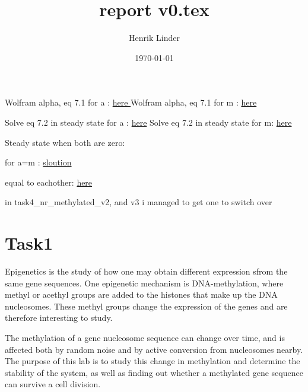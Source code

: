 \documentclass{article}
\title{report v0.tex }
\author{Henrik Linder}
\date{\today}
\begin{document}
\maketitle

Wolfram alpha, eq 7.1 for a  : \href{https://www.wolframalpha.com/input?i=solve+0+\%3D+alpha*\%28a*\%281-a-m\%29+-+a*m\%29+\%2B+\%281+-+alpha\%29*\%28\%281-a-m\%29\%2F2+-+a\%29+for+a+}{here }
Wolfram alpha, eq 7.1 for m  : \href{https://www.wolframalpha.com/input?i=solve+0+%3D+alpha*%28a*%281-a-m%29+-+a*m%29+%2B+%281+-+alpha%29*%28%281-a-m%29%2F2+-+a%29+for+m}{here }

Solve eq 7.2 in steady state for a : \href{https://www.wolframalpha.com/input?i=solve+0+\%3D+alpha*\%28m*\%281-a-m\%29+-+a*m\%29+\%2B+\%281+-+alpha\%29*\%28\%281-a-m\%29\%2F2+-+a\%29+for+a+}{here}
Solve eq 7.2 in steady state for m: \href{https://www.wolframalpha.com/input?i=solve+0+%3D+alpha*%28m*%281-a-m%29+-+a*m%29+%2B+%281+-+alpha%29*%28%281-a-m%29%2F2+-+a%29+for+m}{here}




Steady state when both are zero: 

for a=m : 
\href{https://www.wolframalpha.com/input?i=solve+0+%3D+alpha*%28a*%281-a-a%29+-+a*a%29+%2B+%281+-+alpha%29*%28%281-a-a%29%2F2+-+a%29+for+a+}{sloution}

equal to eachother: 
\href{https://www.wolframalpha.com/input?i=solve+alpha*%28m*%281-a-m%29+-+a*m%29+%2B+%281+-+alpha%29*%28%281-a-m%29%2F2+-+m%29++%3D+alpha*%28a*%281-a-m%29+-+a*m%29+%2B+%281+-+alpha%29*%28%281-a-m%29%2F2+-+a%29+for+a+}{here}







in task4\_nr\_methylated\_v2, and v3 i managed to get one to switch over 




\section{Task1}
Epigenetics is the study of how one may obtain different expression sfrom the same gene sequences. One epigenetic mechanism is DNA-methylation, where methyl or acethyl groups are added to the histones that make up the DNA nucleosomes. These methyl groups change the expression of the genes and are therefore interesting to study.

The methylation of a gene nucleosome sequence can change over time, and is affected both by random noise and by active conversion from nucleosomes nearby. The purpose of this lab is to study this change in methylation and determine the stability of the system, as well as finding out whether a methylated gene sequence can survive a cell division. 
\end{document}
